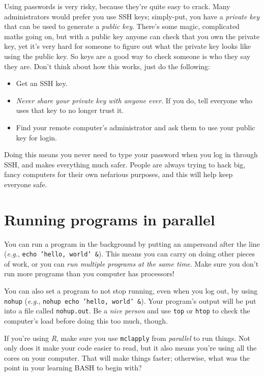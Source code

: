 \documentclass[12pt]{report}
\begin{document}
Using passwords is very risky, because they're quite easy to
crack. Many administrators would prefer you use SSH keys; simply-put,
you have a \emph{private key} that can be used to generate a
\emph{public key}. There's some magic, complicated maths going on, but
with a public key anyone can check that you own the private key, yet
it's very hard for someone to figure out what the private key looks
like using the public key. So keys are a good way to check someone is
who they say they are. Don't think about how this works, just do the
following:

\begin{itemize}
\item Get an SSH key.
\item \emph{ Never share your private key with anyone ever}. If you
  do, tell everyone who uses that key to no longer trust it.
\item Find your remote computer's administrator and ask them to use
  your public key for login.
\end{itemize}

Doing this means you never need to type your password when you log in
through SSH, and makes everything much safer. People are always trying
to hack big, fancy computers for their own nefarious purposes, and
this will help keep everyone safe.
\section{Running programs in parallel}
You can run a program in the background by putting an ampersand after
the line (\emph{e.g.}, \texttt{echo 'hello, world' \&}). This means
you can carry on doing other pieces of work, or you can \emph{run
  multiple programs at the same time}. Make sure you don't run more
programs than you computer has processors!

You can also set a program to not stop running, even when you log out,
by using \texttt{nohup} (\emph{e.g.}, \texttt{nohup echo 'hello,
  world' \&}). Your program's output will be put into a file called
\texttt{nohup.out}. Be a \emph{nice person} and use \texttt{top} or
\texttt{htop} to check the computer's load before doing this too much,
though.

If you're using \emph{R}, make sure you use \texttt{mclapply} from
\emph{parallel} to run things. Not only does it make your code easier
to read, but it also means you're using all the cores on your
computer. That will make things faster; otherwise, what was the point
in your learning BASH to begin with?
\end{document}
